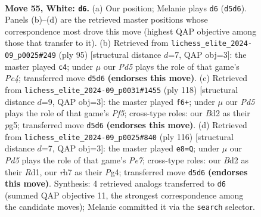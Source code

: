\documentclass[11pt]{article}
\begin{document}
\clearpage

\begin{figure}[p]\centering
\begin{subfigure}{0.46\textwidth}\centering
\resizebox{\linewidth}{!}{%
\newchessgame
\chessboard[
  setfen={2R5/7r/5k2/1p1P4/4K3/rp6/3B4/8 w - - 1 55},
  showmover=false,
  pgfstyle=straightmove, color=movearrow, markmove={d5-d6}
]}
\caption{}
\end{subfigure}\hfill
\begin{subfigure}{0.46\textwidth}\centering
\resizebox{\linewidth}{!}{%
\newchessgame
\chessboard[
  setfen={8/7b/5K1P/1kp5/8/6r1/7R/8 b - - 5 48},
  showmover=false,
  pgfstyle=straightmove, color=movearrow, markmove={c5-c4}
]}
\caption{}
\end{subfigure}
\\[4pt]
\begin{subfigure}{0.46\textwidth}\centering
\resizebox{\linewidth}{!}{%
\newchessgame
\chessboard[
  setfen={8/4k3/1R6/4KPpp/8/8/8/7r w - - 1 60},
  showmover=false,
  pgfstyle=straightmove, color=movearrow, markmove={f5-f6}
]}
\caption{}
\end{subfigure}\hfill
\begin{subfigure}{0.46\textwidth}\centering
\resizebox{\linewidth}{!}{%
\newchessgame
\chessboard[
  setfen={r7/4PK2/8/2k5/p5P1/8/7p/3R4 w - - 0 59},
  showmover=false,
  pgfstyle=straightmove, color=movearrow, markmove={e7-e8}
]}
\caption{}
\end{subfigure}
\caption{\textbf{Move 55, White: \texttt{d6}.} (a) Our position; Melanie plays \texttt{d6} (\texttt{d5d6}). Panels (b)--(d) are the retrieved master positions whose correspondence most drove this move (highest QAP objective among those that transfer to it). (b) Retrieved from \texttt{lichess\_elite\_2024-09\_p0025\#249} (ply 95) [structural distance $d$=7, QAP obj=3]: the master played \texttt{c4}; under $\mu$ our \emph{Pd5} plays the role of that game's \emph{Pc4}; transferred move \texttt{d5d6} \textbf{(endorses this move)}. (c) Retrieved from \texttt{lichess\_elite\_2024-09\_p0031\#1455} (ply 118) [structural distance $d$=9, QAP obj=3]: the master played \texttt{f6+}; under $\mu$ our \emph{Pd5} plays the role of that game's \emph{Pf5}; cross-type roles: our \emph{B}d2 as their \emph{p}g5; transferred move \texttt{d5d6} \textbf{(endorses this move)}. (d) Retrieved from \texttt{lichess\_elite\_2024-09\_p0025\#840} (ply 116) [structural distance $d$=7, QAP obj=3]: the master played \texttt{e8=Q}; under $\mu$ our \emph{Pd5} plays the role of that game's \emph{Pe7}; cross-type roles: our \emph{B}d2 as their \emph{R}d1, our \emph{r}h7 as their \emph{P}g4; transferred move \texttt{d5d6} \textbf{(endorses this move)}. Synthesis: 4 retrieved analogs transferred to \texttt{d6} (summed QAP objective 11, the strongest correspondence among the candidate moves); Melanie committed it via the \texttt{search} selector.}
\label{fig:thought-m108}
\end{figure}
\end{document}
